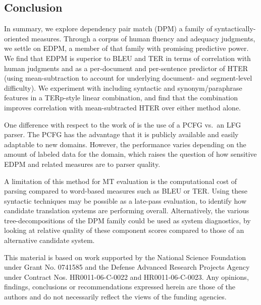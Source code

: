 \documentclass{kluwer}    %
\begin{document}
\begin{article}
\section{Conclusion}
\label{sec:conclusion}
In summary, we explore dependency pair match (DPM) a family of
syntactically-oriented measures.  Through a corpus of human fluency
and adequacy judgments,
we settle on EDPM, a member of that family with promising predictive
power.  We find that EDPM is superior to BLEU and TER in terms of
correlation with human judgments and as a per-document and
per-sentence predictor of HTER (using mean-subtraction to account for
underlying document- and segment-level difficulty).
We experiment with including syntactic and synonym/paraphrase 
features in a TERp-style linear combination, and find that the combination
improves correlation with mean-subtracted HTER over either method alone.

One difference with respect to the work of  is the use of a PCFG vs.\ an LFG parser. The PCFG has the advantage that it
is publicly available and easily adaptable to new domains.  However, the performance varies depending on the amount of labeled data for the domain, which raises the question of how sensitive EDPM and related measures are to parser quality.

A limitation of this method for MT evaluation is the computational
cost of parsing compared to word-based measures such as BLEU or TER.
Using these syntactic techniques may be possible as a late-pass
evaluation, to identify how candidate translation systems are
performing overall.  Alternatively, the various tree-decompositions of
the DPM family could be used as system diagnostics, by looking at
relative quality of these component scores compared to those of an
alternative candidate system.



\acknowledgements

{\small This material is based on work supported by the National
  Science Foundation under Grant No. 0741585 and the Defense Advanced
  Research Projects Agency under Contract Nos. HR0011-06-C-0022 and
  HR0011-06-C-0023.
  Any opinions, findings, conclusions or recommendations expressed
  herein are those of the authors and do not necessarily
  reflect the views of the funding agencies.  }


\theendnotes




\end{article}
\end{document}
